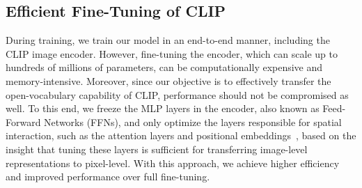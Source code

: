 \documentclass[10pt,twocolumn,letterpaper]{article}
\begin{document}
\subsection{Efficient Fine-Tuning of CLIP}
During training, we train our model in an end-to-end manner, including the CLIP image encoder. However, fine-tuning the encoder, which can scale up to hundreds of millions of parameters, can be computationally expensive and memory-intensive. Moreover, since our objective is to effectively transfer the open-vocabulary capability of CLIP, performance should not be compromised as well. To this end, we freeze the MLP layers in the encoder, also known as Feed-Forward Networks (FFNs), and only optimize the layers responsible for spatial interaction, such as the attention layers and positional embeddings~\cite{vaswani2017attention}, based on the insight that tuning these layers is sufficient for transferring image-level representations to pixel-level. With this approach, we achieve higher efficiency and improved performance over full fine-tuning.
\end{document}
